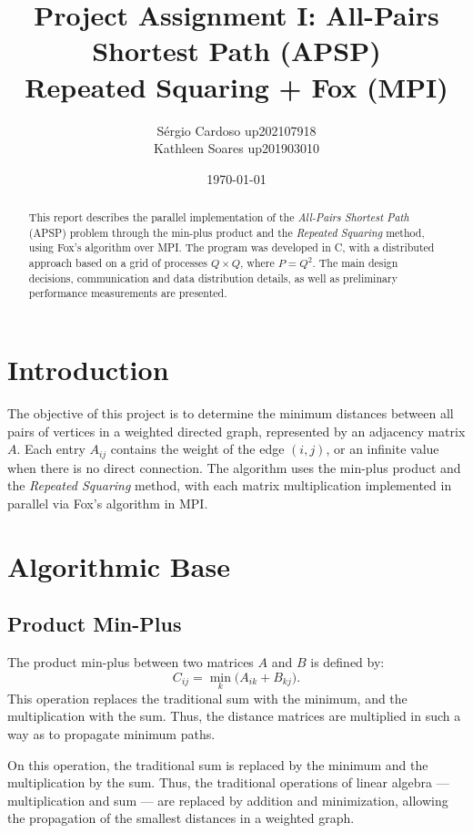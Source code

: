 \documentclass[10pt,a4paper]{article}
\title{Project Assignment I: All-Pairs Shortest Path (APSP)\\
\large Repeated Squaring + Fox (MPI)}
\author{Sérgio Cardoso up202107918 \\ Kathleen Soares up201903010}
\date{\today}
\begin{document}
\maketitle

\begin{abstract}
This report describes the parallel implementation of the \emph{All-Pairs Shortest Path} (APSP) problem through the min-plus product and the \emph{Repeated Squaring} method, using Fox's algorithm over MPI. The program was developed in C, with a distributed approach based on a grid of processes \(Q \times Q\), where \(P = Q^2\). The main design decisions, communication and data distribution details, as well as preliminary performance measurements are presented.
\end{abstract}

\section{Introduction}
The objective of this project is to determine the minimum distances between all pairs of vertices in a weighted directed graph, represented by an adjacency matrix \(A\). Each entry \(A_{ij}\) contains the weight of the edge \((i,j)\), or an infinite value when there is no direct connection. The algorithm uses the min-plus product and the \emph{Repeated Squaring} method, with each matrix multiplication implemented in parallel via Fox's algorithm in MPI.

\section{Algorithmic Base}
\subsection{Product Min-Plus}
The product min-plus between two matrices \(A\) and \(B\) is defined by:
\begin{equation}
C_{ij} = \min_k \bigl(A_{ik} + B_{kj}\bigr).
\end{equation}
This operation replaces the traditional sum with the minimum, and the multiplication with the sum. Thus, the distance matrices are multiplied in such a way as to propagate minimum paths.

On this operation, the traditional sum is replaced by the minimum and the multiplication by the sum.
Thus, the traditional operations of linear algebra — multiplication and sum — are replaced by addition and minimization, allowing the propagation of the smallest distances in a weighted graph.
\end{document}
